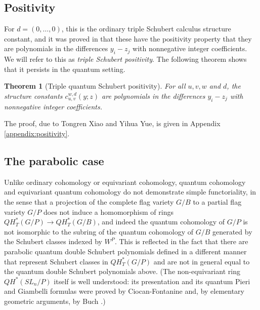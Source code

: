 \documentclass{amsart}
\newtheorem{theorem}[lemma]{Theorem}
\theoremstyle{definition}
\theoremstyle{remark}
\numberwithin{equation}{section}
\begin{document}
\subsection{Positivity}

For $d=(0,\ldots,0)$, this is the ordinary triple Schubert calculus structure constant, and it was proved in \cite{gao2025grahampositivitytripleschubert} that these have the positivity property that they are polynomials in the differences $y_i-z_j$ with nonnegative integer coefficients. We will refer to this as \emph{triple Schubert positivity}. The following theorem shows that it persists in the quantum setting.
\begin{theorem}[Triple quantum Schubert positivity] \label{theorem:positivity}
For all $u,v,w$ and $d$, the structure constants $c_{u,v}^{w,d}(y;z)$ are polynomials in the differences $y_i-z_j$ with nonnegative integer coefficients.
\end{theorem}
The proof, due to Tongren Xiao and Yihua Yue, is given in Appendix \ref{appendix:positivity}.


\subsection{The parabolic case} \label{section:definitions:parabolic}

Unlike ordinary cohomology or equivariant cohomology, quantum cohomology and equivariant quantum cohomology do not demonstrate simple functoriality, in the sense that a projection of the complete flag variety $G/B$ to a partial flag variety $G/P$ does not induce a homomorphism of rings $QH_T^*(G/P)\to QH_T^*(G/B)$, and indeed the quantum cohomology of $G/P$ is not isomorphic to the subring of the quantum cohomology of $G/B$ generated by the Schubert classes indexed by $W^P$. This is reflected in the fact that there are parabolic quantum double Schubert polynomials defined in a different manner that represent Schubert classes in $QH_T^*(G/P)$ \cite{lam2014quantum} and are not in general equal to the quantum double Schubert polynomials above. (The non-equivariant ring $QH^*(SL_n/P)$ itself is well understood: its presentation and its quantum Pieri and Giambelli formulas were proved by Ciocan-Fontanine \cite{ciocan1999partial} and, by elementary geometric arguments, by Buch \cite{buch2005partial}.)
\end{document}
